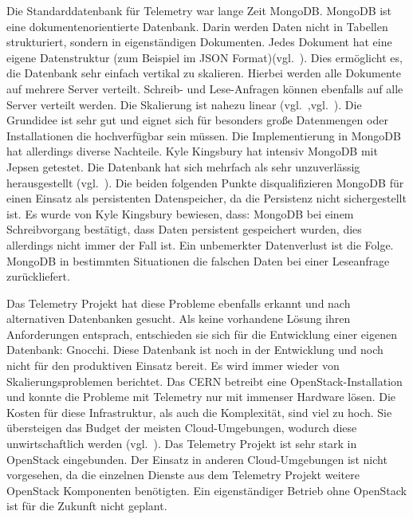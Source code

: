 \begin{outline}
  \1 Die Standarddatenbank für Telemetry war lange Zeit MongoDB\@. MongoDB ist
  eine dokumentenorientierte Datenbank. Darin werden Daten nicht in Tabellen
  strukturiert, sondern in eigenständigen Dokumenten. Jedes Dokument hat eine
  eigene Datenstruktur (zum Beispiel im \gls{JSON}
  Format)(vgl.~\cite{Dokumentenorientierte_Datenbank}). Dies ermöglicht es, die
  Datenbank sehr einfach vertikal zu skalieren. Hierbei werden alle Dokumente
  auf mehrere Server verteilt. Schreib- und Lese-Anfragen können ebenfalls auf
  alle Server verteilt werden. Die Skalierung ist nahezu linear
  (vgl.~\cite{MongoDB_Architecture},vgl.~\cite{What_is_MongoDB}). Die Grundidee
  ist sehr gut und eignet sich für besonders große Datenmengen oder
  Installationen die hochverfügbar sein müssen. Die Implementierung in MongoDB
  hat allerdings diverse Nachteile. Kyle Kingsbury hat intensiv MongoDB mit
  \gls{Jepsen} getestet. Die Datenbank hat sich mehrfach als sehr unzuverlässig
  herausgestellt (vgl.~\cite{MongoDB_on_Jepsen}). Die beiden folgenden Punkte
  disqualifizieren MongoDB für einen Einsatz als persistenten Datenspeicher,
  da die Persistenz nicht sichergestellt ist. Es wurde von Kyle Kingsbury
  bewiesen, dass:
    \2 MongoDB bei einem Schreibvorgang bestätigt, dass Daten persistent
    gespeichert wurden, dies allerdings nicht immer der Fall ist. Ein
    unbemerkter Datenverlust ist die Folge.
    \2 MongoDB in bestimmten Situationen die falschen Daten bei einer
    Leseanfrage zurückliefert.

  \1 Das Telemetry Projekt hat diese Probleme ebenfalls erkannt und nach
  alternativen Datenbanken gesucht. Als keine vorhandene Lösung ihren
  Anforderungen entsprach, entschieden sie sich für die Entwicklung einer
  eigenen Datenbank: \gls{Gnocchi}. Diese Datenbank ist noch in der Entwicklung
  und noch nicht für den produktiven Einsatz bereit.
  \1 Es wird immer wieder von Skalierungsproblemen berichtet. Das CERN betreibt
  eine OpenStack-Installation und konnte die Probleme mit Telemetry nur mit
  immenser Hardware lösen. Die Kosten für diese Infrastruktur, als auch die
  Komplexität, sind viel zu hoch. Sie übersteigen das Budget der meisten
  Cloud-Umgebungen, wodurch diese unwirtschaftlich werden
  (vgl.~\cite{OpenStack_CERN}).
  \1 Das Telemetry Projekt ist sehr stark in OpenStack eingebunden. Der Einsatz
  in anderen Cloud-Umgebungen ist nicht vorgesehen, da die einzelnen Dienste
  aus dem Telemetry Projekt weitere OpenStack Komponenten benötigten. Ein
  eigenständiger Betrieb ohne OpenStack ist für die Zukunft nicht geplant.
\end{outline}

